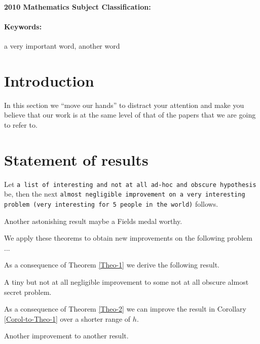 \documentclass[12pt]{article}
\begin{document}
\paragraph*{2010 Mathematics Subject Classification:}

\paragraph*{Keywords:} {a very important word, another word} 


\section{Introduction}
In this section we ``move our hands'' to distract your attention and make you believe that our work is at the same level of that of the papers that we are going to refer to.

\section{Statement of results}

\begin{theorem}\label{Theo-1}
Let {\tt a list of interesting and not at all ad-hoc and obscure hypothesis} be, then the next {\tt almost negligible improvement on a very interesting problem (very interesting for 5 people in the world)} follows.
\end{theorem}


\begin{theorem}\label{Theo-2}
Another astonishing result maybe a Fields medal worthy.
\end{theorem}

We apply these theorems to obtain new improvements on the following problem ...

As a consequence of Theorem \ref{Theo-1} we derive the following result.


\begin{corollary}\label{Corol-to-Theo-1}
A tiny but not at all negligible improvement to some not at all obscure almost secret problem.
\end{corollary}

As a consequence of
Theorem \ref{Theo-2} we can improve the result in Corollary \ref{Corol-to-Theo-1} over a shorter range of $h$.

\begin{corollary}\label{cinco-variables-corolario}
Another improvement to another result.
\end{corollary}
\end{document}
